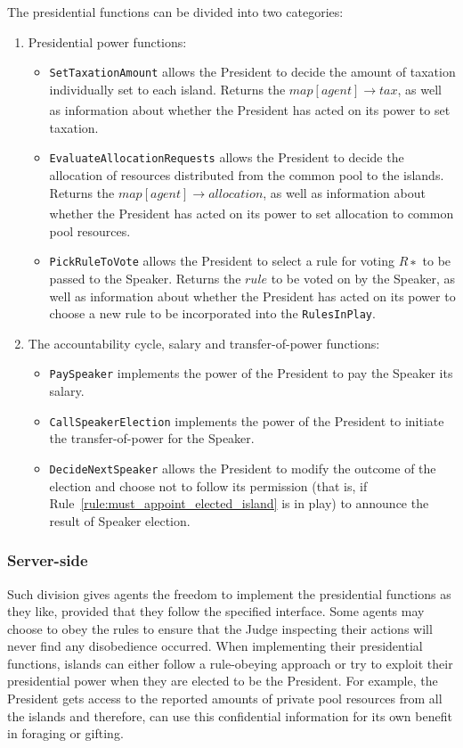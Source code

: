 The presidential functions can be divided into two categories:
\begin{enumerate}
\item Presidential power functions:
    \begin{itemize}
        \item \texttt{SetTaxationAmount} allows the President to decide the amount of taxation individually set to each island. Returns the $map[agent] \xrightarrow[]{} tax$, as well as information about whether the President has acted on its power to set taxation.
        \item \texttt{EvaluateAllocationRequests} allows the President to decide the allocation of resources distributed from the common pool to the islands. Returns the $map[agent] \xrightarrow[]{} allocation$, as well as information about whether the President has acted on its power to set allocation to common pool resources.
        \item \texttt{PickRuleToVote} allows the President to select a rule for voting $R∗$ to be passed to the Speaker. Returns the $rule$ to be voted on by the Speaker, as well as information about whether the President has acted on its power to choose a new rule to be incorporated into the \texttt{RulesInPlay}.
    \end{itemize}

\item The accountability cycle, salary and transfer-of-power functions:
    \begin{itemize}
        \item \texttt{PaySpeaker} implements the power of the President to pay the Speaker its salary. 
        \item \texttt{CallSpeakerElection} implements the power of the President to initiate the transfer-of-power for the Speaker.
        \item \texttt{DecideNextSpeaker} allows the President to modify the outcome of the election and choose not to follow its permission (that is, if Rule~\ref{rule:must_appoint_elected_island} is in play) to announce the result of Speaker election.
    \end{itemize}
\end{enumerate}

\subsubsection{Server-side}
\label{sub:president:server-side}

Such division gives agents the freedom to implement the presidential functions as they like, provided that they follow the specified interface. Some agents may choose to obey the rules to ensure that the Judge inspecting their actions will never find any disobedience occurred. When implementing their presidential functions, islands can either follow a rule-obeying approach or try to exploit their presidential power when they are elected to be the President. For example, the President gets access to the reported amounts of private pool resources from all the islands and therefore, can use this confidential information for its own benefit in foraging or gifting.

